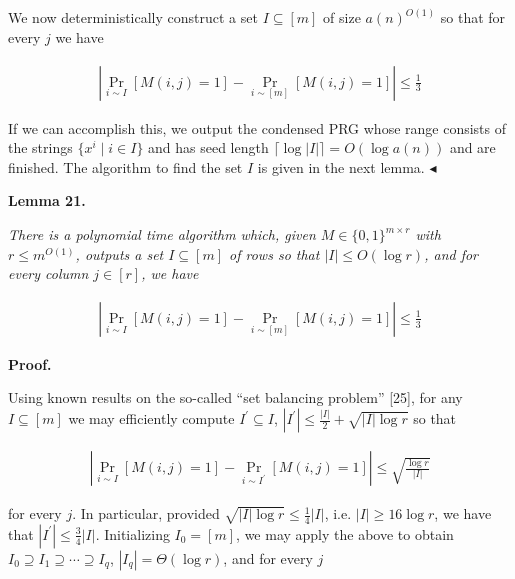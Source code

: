 We now deterministically construct a set $I\subseteq[m]$ of size $a(n)^{O(1)}$ so that for every $j$ we have\par


\[\begin{gathered}
|\Pr_{i\sim I}[M(i,j)=1]-\Pr_{i\sim[m]}[M(i,j)=1]|\leq\frac{1}{3}
\end{gathered}\]


If we can accomplish this, we output the condensed PRG whose range consists of the strings $\{x^{i}\mid i\in I\}$ and has seed length $\lceil\log|I|\rceil=O(\log a(n))$ and are finished. The algorithm to find the set $I$ is given in the next lemma.
$\blacktriangleleft$\par





\par\medskip\noindent\textbf{
\textbf{Lemma 21}\textbf{.}
}\par



\emph{There is a polynomial time algorithm which, given $M\in\{0,1\}^{m\times r}$ with $r\leq m^{O(1)}$, outputs a set $I\subseteq[m]$ of rows so that $|I|\leq O(\log r)$, and for every column $j\in[r]$, we have}\par


\[\begin{gathered}
|\Pr_{i\sim I}[M(i,j)=1]-\Pr_{i\sim[m]}[M(i,j)=1]|\leq\frac{1}{3}
\end{gathered}\]







\par\medskip\noindent\textbf{Proof.}\par




Using known results on the so-called “set balancing problem” [25], for any $I\subseteq[m]$ we may efficiently compute $I^{\prime}\subseteq I$, $|I^{\prime}|\leq\frac{|I|}{2}+\sqrt{|I|\log r}$ so that\par


\[\begin{gathered}
|\Pr_{i\sim I}[M(i,j)=1]-\Pr_{i\sim I^{\prime}}[M(i,j)=1]|\leq\sqrt{\frac{\log
r}{|I|}}
\end{gathered}\]


for every $j$. In particular, provided $\sqrt{|I|\log r}\leq\frac{1}{4}|I|$, i.e. $|I|\geq 16\log r$, we have that $|I^{\prime}|\leq\frac{3}{4}|I|$.
Initializing $I_{0}=[m]$, we may apply the above to obtain $I_{0}\supseteq I_{1}\supseteq\cdots\supseteq I_{q}$, $|I_{q}|=\Theta(\log r)$, and for every $j$\par


